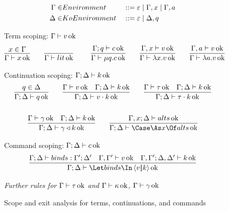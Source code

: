 \documentclass{article}
\begin{document}
\begin{figure}[h]
\centering
\begin{gather*}
\begin{aligned}
  \Gamma \in& Environment
  &
  &::= \varepsilon
  \mid \Gamma, x
  \mid \Gamma, a
  \\
  \Delta \in& KoEnvironment
  &
  &::= \varepsilon
  \mid \Delta, q
\end{aligned}
\end{gather*}

Term scoping: $\Gamma \vdash v \operatorname{ok}$
\begin{gather*}
  \infer
  {\Gamma \vdash x \Ok}
  {x \in \Gamma}
  \qquad
  \axiom{\Gamma \vdash \lit \Ok}
  \qquad
  \infer
  {\Gamma \vdash \compute q \com \Ok}
  {
    \Gamma; q \vdash \com \Ok
  }
  \qquad
  \infer
  {\Gamma \vdash \fn x \tm \Ok}
  {
    \Gamma, x \vdash \tm \Ok
  }
  \qquad
  \infer
  {\Gamma \vdash \fn a \tm \Ok}
  {
    \Gamma, a \vdash \tm \Ok
  }
\end{gather*}

Continuation scoping: $\Gamma; \Delta \vdash k \operatorname{ok}$
\begin{gather*}
  \infer
  {\Gamma;\Delta \vdash q \Ok}
  {q \in \Delta}
  \qquad
  \infer
  {\Gamma;\Delta \vdash \app{\tm}{\ko} \Ok}
  {
    \Gamma \vdash \tm \Ok
    &
    \Gamma;\Delta \vdash \ko \Ok
  }
  \qquad
  \infer
  {\Gamma;\Delta \vdash \app{\ty}{\ko} \Ok}
  {
    \Gamma \vdash \ty \Ok
    &
    \Gamma;\Delta \vdash \ko \Ok
  }
  \\\\
  \infer
  {\Gamma;\Delta \vdash \koerce{\cn}{\ko} \Ok}
  {
    \Gamma \vdash \cn \Ok
    &
    \Gamma;\Delta \vdash \ko \Ok
  }
  \qquad
  \infer
  {\Gamma;\Delta \vdash \caseas{x}{\alts} \Ok}
  {
    \Gamma, x;\Delta \vdash \alts \Ok
  }
\end{gather*}

Command scoping: $\Gamma; \Delta \vdash c \operatorname{ok}$
\begin{gather*}
  \infer
  {\Gamma;\Delta \vdash \mcut{\tm}{\ko}{\binds} \Ok}
  {
    \Gamma;\Delta \vdash \binds : \Gamma';\Delta'
    &
    \Gamma,\Gamma' \vdash \tm \Ok
    &
    \Gamma,\Gamma'; \Delta,\Delta' \vdash \ko \Ok
  }
\end{gather*}


\emph{Further rules for $\Gamma \vdash \tau \operatorname{ok}$ and
  $\Gamma \vdash \kappa \operatorname{ok}$, $\Gamma \vdash \gamma \operatorname{ok}$}
\caption{Scope and exit analysis for terms, continuations, and commands}
\label{fig:scoping-rules}
\end{figure}
\end{document}
